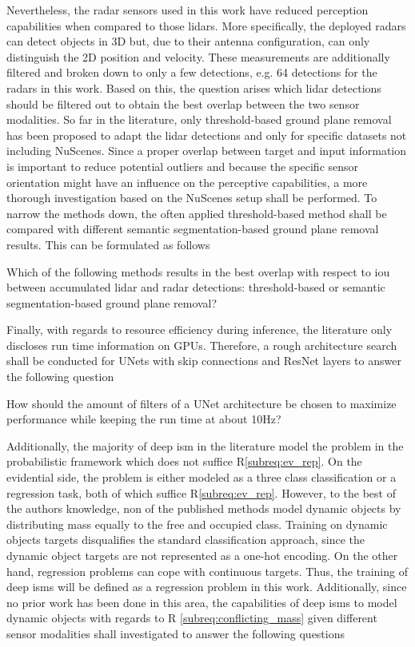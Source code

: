 Nevertheless, the radar sensors used in this work have reduced perception capabilities when compared to those lidars. More specifically, the deployed radars can detect objects in 3D but, due to their antenna configuration, can only distinguish the 2D position and velocity. These measurements are additionally filtered and broken down to only a few detections, e.g. 64 detections for the radars in this work. Based on this, the question arises which lidar detections should be filtered out to obtain the best overlap between the two sensor modalities. So far in the literature, only threshold-based ground plane removal has been proposed to adapt the lidar detections and only for specific datasets not including NuScenes. Since a proper overlap between target and input information is important to reduce potential outliers and because the specific sensor orientation might have an influence on the perceptive capabilities, a more thorough investigation based on the NuScenes setup shall be performed. To narrow the methods down, the often applied threshold-based method shall be compared with different semantic segmentation-based ground plane removal results. This can be formulated as follows
\\
\begin{requ} \label{requ:what_is_best_gt}
	Which of the following methods results in the best overlap with respect to \gls{iou} between accumulated lidar and radar detections: threshold-based or semantic segmentation-based ground plane removal?
\end{requ}
Finally, with regards to resource efficiency during inference, the literature only discloses run time information on GPUs. Therefore, a rough architecture search shall be conducted for UNets with skip connections and ResNet layers to answer the following question\\
\begin{requ} \label{requ:network_search}
	How should the amount of filters of a UNet architecture be chosen to maximize performance while keeping the run time at about 10Hz?
\end{requ}
Additionally, the majority of deep \gls{ism} in the literature model the problem in the probabilistic framework which does not suffice R\ref{subreq:ev_rep}. On the evidential side, the problem is either modeled as a three class classification or a regression task, both of which suffice R\ref{subreq:ev_rep}. However, to the best of the authors knowledge, non of the published methods model dynamic objects by distributing mass equally to the free and occupied class. Training on dynamic objects targets disqualifies the standard classification approach, since the dynamic object targets are not represented as a one-hot encoding. On the other hand, regression problems can cope with continuous targets. Thus, the training of deep \gls{ism}s will be defined as a regression problem in this work. Additionally, since no prior work has been done in this area, the capabilities of deep \gls{ism}s to model dynamic objects with regards to R \ref{subreq:conflicting_mass} given different sensor modalities shall investigated to answer the following questions
